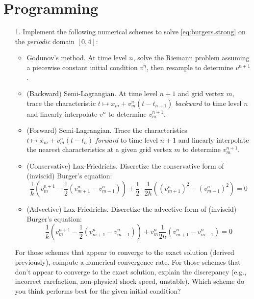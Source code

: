 \documentclass{article}
\begin{document}
\section{Programming}

\begin{itemize}

\item[1.] Implement the following numerical schemes to solve \eqref{eq:burgers.strong} on the \emph{periodic} domain $[0,4]$:
\begin{itemize}
\item Godunov's method. At time level $n$, solve the Riemann problem assuming a piecewise constant initial condition $v^n$, then resample to determine $v^{n+1}$.
\item (Backward) Semi-Lagrangian. At time level $n+1$ and grid vertex $m$, trace the characteristic $t \mapsto x_m + v^n_m \left( t - t_{n+1} \right)$ \emph{backward} to time level $n$ and linearly interpolate $v^n$ to determine $v^{n+1}_m$.
\item (Forward) Semi-Lagrangian. Trace the characteristics $t \mapsto x_m + v^n_m \left( t - t_n \right)$ \emph{forward} to time level $n+1$ and linearly interpolate the nearest characteristics at a given grid vertex $m$ to determine $v^{n+1}_m$.
\item (Conservative) Lax-Friedrichs. Discretize the conservative form of (inviscid) Burger's equation:
\begin{equation*}
\frac{1}{k} \left( v^{n+1}_m - \frac{1}{2} \left( v^n_{m+1} - v^n_{m-1} \right) \right) + \frac{1}{2} \cdot \frac{1}{2h} \left( \left( v^n_{m+1} \right)^2 - \left( v^n_{m-1} \right)^2 \right) = 0
\end{equation*}
\item (Advective) Lax-Friedrichs. Discretize the advective form of (inviscid) Burger's equation:
\begin{equation*}
\frac{1}{k} \left( v^{n+1}_m - \frac{1}{2} \left( v^n_{m+1} - v^n_{m-1} \right) \right) + v^n_m \frac{1}{2h} \left( v^n_{m+1} - v^n_{m-1} \right) = 0
\end{equation*}
\end{itemize}
For those schemes that appear to converge to the exact solution (derived previously), compute a numerical convergence rate. For those schemes that don't appear to converge to the exact solution, explain the discrepancy (e.g., incorrect rarefaction, non-physical shock speed, unstable). Which scheme do you think performs best for the given initial condition?


\end{itemize}
\end{document}
